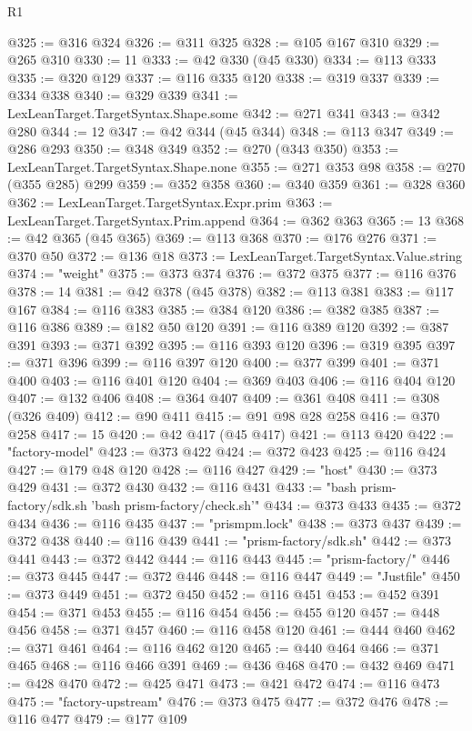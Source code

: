 \begin{lexlean}{R1}
\begin{coremodule}
@325 := @316 @324
@326 := @311 @325
@328 := @105 @167 @310
@329 := @265 @310
@330 := 11
@333 := @42 @330 (@45 @330)
@334 := @113 @333
@335 := @320 @129
@337 := @116 @335 @120
@338 := @319 @337
@339 := @334 @338
@340 := @329 @339
@341 := LexLeanTarget.TargetSyntax.Shape.some
@342 := @271 @341
@343 := @342 @280
@344 := 12
@347 := @42 @344 (@45 @344)
@348 := @113 @347
@349 := @286 @293
@350 := @348 @349
@352 := @270 (@343 @350)
@353 := LexLeanTarget.TargetSyntax.Shape.none
@355 := @271 @353 @98
@358 := @270 (@355 @285) @299
@359 := @352 @358
@360 := @340 @359
@361 := @328 @360
@362 := LexLeanTarget.TargetSyntax.Expr.prim
@363 := LexLeanTarget.TargetSyntax.Prim.append
@364 := @362 @363
@365 := 13
@368 := @42 @365 (@45 @365)
@369 := @113 @368
@370 := @176 @276
@371 := @370 @50
@372 := @136 @18
@373 := LexLeanTarget.TargetSyntax.Value.string
@374 := "weight"
@375 := @373 @374
@376 := @372 @375
@377 := @116 @376
@378 := 14
@381 := @42 @378 (@45 @378)
@382 := @113 @381
@383 := @117 @167
@384 := @116 @383
@385 := @384 @120
@386 := @382 @385
@387 := @116 @386
@389 := @182 @50 @120
@391 := @116 @389 @120
@392 := @387 @391
@393 := @371 @392
@395 := @116 @393 @120
@396 := @319 @395
@397 := @371 @396
@399 := @116 @397 @120
@400 := @377 @399
@401 := @371 @400
@403 := @116 @401 @120
@404 := @369 @403
@406 := @116 @404 @120
@407 := @132 @406
@408 := @364 @407
@409 := @361 @408
@411 := @308 (@326 @409)
@412 := @90 @411
@415 := @91 @98 @28 @258
@416 := @370 @258
@417 := 15
@420 := @42 @417 (@45 @417)
@421 := @113 @420
@422 := "factory-model"
@423 := @373 @422
@424 := @372 @423
@425 := @116 @424
@427 := @179 @48 @120
@428 := @116 @427
@429 := "host"
@430 := @373 @429
@431 := @372 @430
@432 := @116 @431
@433 := "bash prism-factory/sdk.sh 'bash prism-factory/check.sh'"
@434 := @373 @433
@435 := @372 @434
@436 := @116 @435
@437 := "prismpm.lock"
@438 := @373 @437
@439 := @372 @438
@440 := @116 @439
@441 := "prism-factory/sdk.sh"
@442 := @373 @441
@443 := @372 @442
@444 := @116 @443
@445 := "prism-factory/"
@446 := @373 @445
@447 := @372 @446
@448 := @116 @447
@449 := "Justfile"
@450 := @373 @449
@451 := @372 @450
@452 := @116 @451
@453 := @452 @391
@454 := @371 @453
@455 := @116 @454
@456 := @455 @120
@457 := @448 @456
@458 := @371 @457
@460 := @116 @458 @120
@461 := @444 @460
@462 := @371 @461
@464 := @116 @462 @120
@465 := @440 @464
@466 := @371 @465
@468 := @116 @466 @391
@469 := @436 @468
@470 := @432 @469
@471 := @428 @470
@472 := @425 @471
@473 := @421 @472
@474 := @116 @473
@475 := "factory-upstream"
@476 := @373 @475
@477 := @372 @476
@478 := @116 @477
@479 := @177 @109

\end{coremodule}
\end{lexlean}
